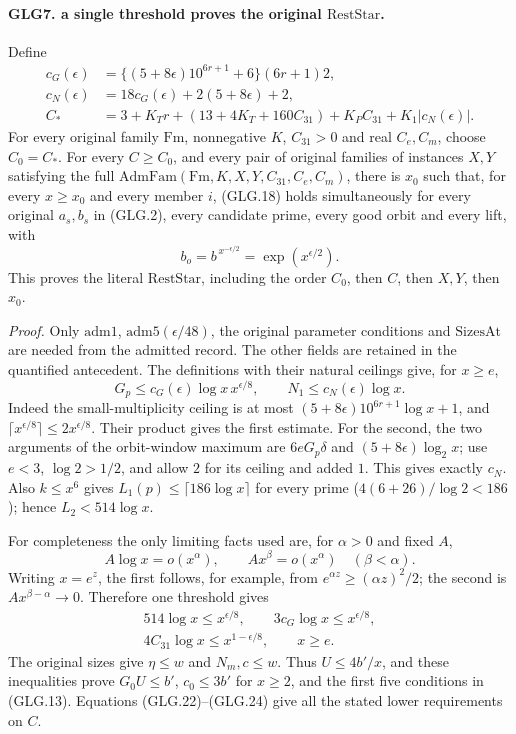 \documentclass[11pt,a4paper]{article}
\numberwithin{equation}{section}
\theoremstyle{remark}\newtheorem{remark}[theorem]{Remark}
\begin{document}
\paragraph{GLG7. a single threshold proves the original \(\mathrm{RestStar}\).}
\label{claim:GLG7}
Define
\[
 \begin{split}
 c_G(\epsilon)&=\{(5+8\epsilon)10^{6r+1}+6\}(6r+1)2,\\
 c_N(\epsilon)&=18c_G(\epsilon)+2(5+8\epsilon)+2,\\
 C_*&=3+K_Tr+(13+4K_T+160C_{31})
                    +K_PC_{31}+K_1|c_N(\epsilon)|.
 \end{split}                                                       \tag{GLG.22}
\]
For every original family \(\mathrm{Fm}\), nonnegative \(K\),
\(C_{31}>0\) and real \(C_e,C_m\), choose \(C_0=C_*\).
For every \(C\ge C_0\), and every pair of original families
of instances \(X,Y\) satisfying the full
\(\mathrm{AdmFam}(\mathrm{Fm},K,X,Y,C_{31},C_e,C_m)\),
there is \(x_0\) such that, for every \(x\ge x_0\) and every
member \(i\), (GLG.18) holds simultaneously for every
original \(a_s,b_s\) in (GLG.2), every candidate prime,
every good orbit and every lift, with
\[
          b_o=b^{\,x^{-\epsilon/2}}=\exp(x^{\epsilon/2}).           \tag{GLG.23}
\]
This proves the literal \(\mathrm{RestStar}\), including the
order \(C_0\), then \(C\), then \(X,Y\), then \(x_0\).

\emph{Proof.}
Only \(\mathrm{adm1}\), \(\mathrm{adm5}(\epsilon/48)\),
the original parameter conditions and \(\mathrm{SizesAt}\)
are needed from the admitted record. The other fields are
retained in the quantified antecedent.
The definitions with their natural ceilings give, for \(x\ge e\),
\[
 G_p\le c_G(\epsilon)\log x\,x^{\epsilon/8},
             \qquad N_1\le c_N(\epsilon)\log x.                  \tag{GLG.24}
\]
Indeed the small-multiplicity ceiling is at most
\((5+8\epsilon)10^{6r+1}\log x+1\), and
\(\lceil x^{\epsilon/8}\rceil\le2x^{\epsilon/8}\).
Their product gives the first estimate. For the second,
the two arguments of the orbit-window maximum are
\(6eG_p\delta\) and \((5+8\epsilon)\log_2x\);
use \(e<3\), \(\log2>1/2\), and allow \(2\) for its
ceiling and added \(1\). This gives exactly \(c_N\).
Also \(k\le x^6\) gives
\(L_1(p)\le\lceil186\log x\rceil\) for every prime
(\(4(6+26)/\log2<186\)); hence \(L_2<514\log x\).

For completeness the only limiting facts used are, for
\(\alpha>0\) and fixed \(A\),
\[
 A\log x=o(x^\alpha),\qquad
 Ax^\beta=o(x^\alpha)\quad(\beta<\alpha).
 \]
Writing \(x=e^z\), the first follows, for example, from
\(e^{\alpha z}\ge(\alpha z)^2/2\); the second is
\(Ax^{\beta-\alpha}\to0\). Therefore one threshold gives
\[
 \begin{gathered}
 514\log x\le x^{\epsilon/8},\qquad
 3c_G\log x\le x^{\epsilon/8},\\
 4C_{31}\log x\le x^{1-\epsilon/8},\qquad x\ge e .
 \end{gathered}
 \]
The original sizes give \(\eta\le w\) and \(N_m,c\le w\).
Thus \(U\le4b'/x\), and these inequalities prove
\(G_0U\le b'\), \(c_0\le3b'\) for \(x\ge2\), and the
first five conditions in (GLG.13). Equations (GLG.22)--(GLG.24)
give all the stated lower requirements on \(C\).
\end{document}
